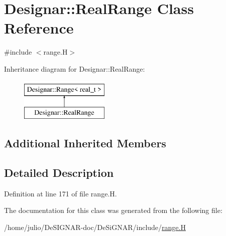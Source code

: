 \hypertarget{class_designar_1_1_real_range}{}\section{Designar\+:\+:Real\+Range Class Reference}
\label{class_designar_1_1_real_range}


{\ttfamily \#include $<$range.\+H$>$}

Inheritance diagram for Designar\+:\+:Real\+Range\+:\begin{figure}[H]
\begin{center}
\leavevmode
\includegraphics[height=2.000000cm]{class_designar_1_1_real_range}
\end{center}
\end{figure}
\subsection*{Additional Inherited Members}


\subsection{Detailed Description}


Definition at line 171 of file range.\+H.



The documentation for this class was generated from the following file\+:\begin{DoxyCompactItemize}
\item 
/home/julio/\+De\+S\+I\+G\+N\+A\+R-\/doc/\+De\+Si\+G\+N\+A\+R/include/\hyperlink{range_8_h}{range.\+H}\end{DoxyCompactItemize}
